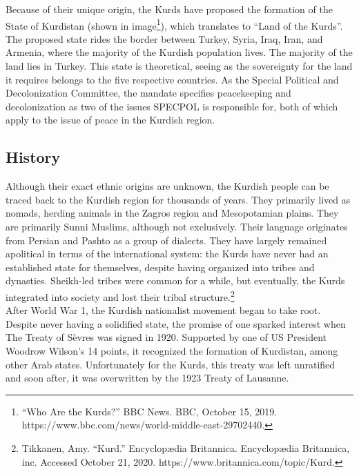 \documentclass[10pt, letterpaper]{article}
\begin{document}
Because of their unique origin, the Kurds have proposed the formation of
the State of Kurdistan (shown in image\footnote{``Who Are the Kurds?''
  BBC News. BBC, October 15, 2019.
  https://www.bbc.com/news/world-middle-east-29702440.}), which
translates to ``Land of the Kurds''. The proposed state rides the border
between Turkey, Syria, Iraq, Iran, and Armenia, where the majority of
the Kurdish population lives. The majority of the land lies in Turkey.
This state is theoretical, seeing as the sovereignty for the land it
requires belongs to the five respective countries. As the Special
Political and Decolonization Committee, the mandate specifies
peacekeeping and decolonization as two of the issues SPECPOL is
responsible for, both of which apply to the issue of peace in the
Kurdish region. \\

\subsection{History} 

Although their exact ethnic origins are unknown, the Kurdish people can
be traced back to the Kurdish region for thousands of years. They
primarily lived as nomads, herding animals in the Zagros region and
Mesopotamian plains. They are primarily Sunni Muslims, although not
exclusively. Their language originates from Persian and Pashto as a
group of dialects. They have largely remained apolitical in terms of the
international system: the Kurds have never had an established state for
themselves, despite having organized into tribes and dynasties.
Sheikh-led tribes were common for a while, but eventually, the Kurds
integrated into society and lost their tribal structure.\footnote{Tikkanen,
  Amy. ``Kurd.'' Encyclopædia Britannica. Encyclopædia Britannica, inc.
  Accessed October 21, 2020. https://www.britannica.com/topic/Kurd.} \\

After World War 1, the Kurdish nationalist movement began to take root.
Despite never having a solidified state, the promise of one sparked
interest when The Treaty of Sèvres was signed in 1920. Supported by one
of US President Woodrow Wilson's 14 points, it recognized the formation
of Kurdistan, among other Arab states. Unfortunately for the Kurds, this
treaty was left unratified and soon after, it was overwritten by the
1923 Treaty of Lausanne. \\
\end{document}
